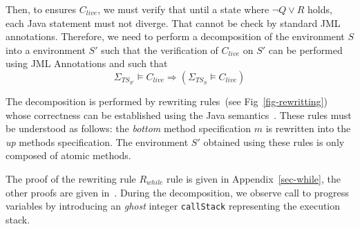 Then, to ensures $C_{live}$, we must verify that
until a state where $\neg Q \vee R$ holds, each Java 
statement must not diverge. That cannot be check by
standard JML annotations.
Therefore, we need to perform a decomposition
of the environment $S$ into a environment $S'$
such that the verification of $C_{live}$ on $S'$ can
be performed using JML Annotations and such that
$$\Sigma_{TS_{S'}} \models C_{live} 
      \Rightarrow  
          (\Sigma_{TS_S} \models C_{live})$$


The decomposition is performed by rewriting 
rules~(see Fig~\ref{fig-rewritting}) whose 
correctness can be established using the Java 
semantics~\cite{TheseMarieke}. These rules must be understood
as follows: the \textit{bottom} method specification $m$ is rewritten 
into the \textit{up} methods specification. The environment $S'$
obtained using these rules is only composed of atomic methods.

The proof of the rewriting rule $R_{while}$
rule is given in Appendix~\ref{sec-while}, the other proofs are given 
in~\cite{reportTACAS}. During the decomposition, we observe call to
progress variables by introducing an 
\textit{ghost} integer \texttt{callStack} representing 
the execution stack. %



